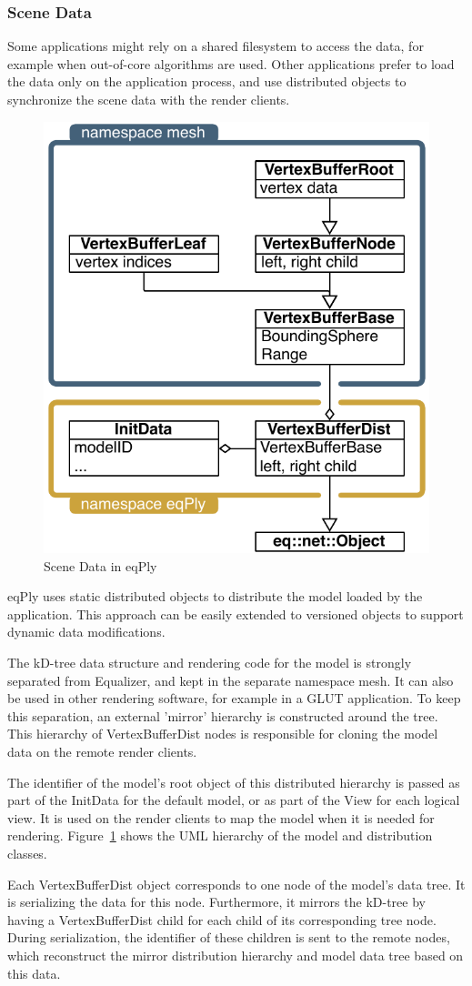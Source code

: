 \documentclass[10pt,a4]{scrartcl}
\newcommand{\fig}[1]{Figure~\ref{#1}}
\begin{document}
\subsubsection{\label{sSceneData}Scene Data}

Some applications might rely on a shared filesystem to access the data,
for example when out-of-core algorithms are used. Other applications
prefer to load the data only on the application process, and use
distributed objects to synchronize the scene data with the render
clients.

\begin{figure}
  \includegraphics[width=.382\textwidth]{images/modelDist.pdf}
  {\caption{\label{fModelDist}Scene Data in eqPly}}
\end{figure}
\textsf{eqPly} uses static distributed objects to distribute the model
loaded by the application. This approach can be easily extended to
versioned objects to support dynamic data modifications.

The kD-tree data structure and rendering code for the model is strongly
separated from Equalizer, and kept in the separate namespace
\textsf{mesh}. It can also be used in other rendering software, for
example in a GLUT application. To keep this separation, an external
'mirror' hierarchy is constructed around the tree. This hierarchy of
\textsf{VertexBufferDist} nodes is responsible for cloning the model
data on the remote render clients.

The identifier of the model's root object of this distributed hierarchy
is passed as part of the \textsf{InitData} for the default model, or as
part of the \textsf{View} for each logical view. It is used on the
render clients to map the model when it is needed for
rendering. \fig{fModelDist} shows the UML hierarchy of the model and
distribution classes.

Each \textsf{VertexBufferDist} object corresponds to one node of the
model's data tree. It is serializing the data for this
node. Furthermore, it mirrors the kD-tree by having a
\textsf{VertexBufferDist} child for each child of its corresponding tree
node. During serialization, the identifier of these children is sent to
the remote nodes, which reconstruct the mirror distribution hierarchy
and model data tree based on this data.
\end{document}
